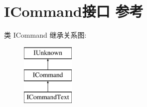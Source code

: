 \hypertarget{interface_i_command}{}\section{I\+Command接口 参考}
\label{interface_i_command}
类 I\+Command 继承关系图\+:\begin{figure}[H]
\begin{center}
\leavevmode
\includegraphics[height=3.000000cm]{interface_i_command}
\end{center}
\end{figure}
